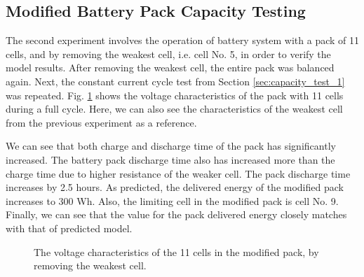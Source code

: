 \documentclass[10pt,twocolumn]{IEEEtran}
\begin{document}
\subsection{Modified  Battery Pack Capacity Testing}
The second  experiment involves the operation of battery system with a pack of 11 cells, and by removing the weakest cell, i.e. cell No. 5, in order to verify the model results. 
After removing the weakest cell, the entire pack was balanced again. Next, the constant current cycle test from Section \ref{sec:capacity_test_1}  was repeated.
Fig.  \ref{fig:cell_removal3} shows the voltage characteristics of the pack with 11 cells during a full cycle.
Here, we can also see the characteristics of the weakest cell from the previous experiment as a reference.

We can see that both charge and discharge time of the pack has significantly increased. 
The battery pack discharge time also has increased more than the charge time due to higher resistance of the weaker cell.
The pack discharge time  increases by 2.5 hours.
As predicted,  the delivered energy of the modified pack increases to 300 Wh.
Also,  the limiting cell in the modified pack is cell No. 9. 
Finally, we can see that the value for the pack delivered energy closely matches with that of predicted model.

\begin{figure}
\centering
\vspace{-0.2cm}
{} \vspace{-0.1cm}
\caption{The voltage characteristics of the 11 cells in the modified pack,  by removing the weakest cell. }
\vspace{-0.3cm}
\label{fig:cell_removal3}
\end{figure} 
\end{document}
